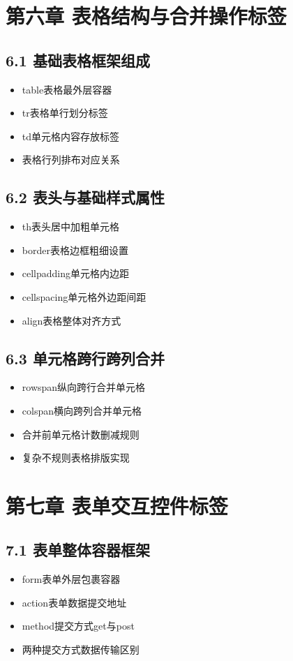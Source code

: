 \section{第六章 表格结构与合并操作标签}
\subsection{6.1 基础表格框架组成}
\begin{itemize}[leftmargin=*]
\item table表格最外层容器
\item tr表格单行划分标签
\item td单元格内容存放标签
\item 表格行列排布对应关系
\end{itemize}

\subsection{6.2 表头与基础样式属性}
\begin{itemize}[leftmargin=*]
\item th表头居中加粗单元格
\item border表格边框粗细设置
\item cellpadding单元格内边距
\item cellspacing单元格外边距间距
\item align表格整体对齐方式
\end{itemize}

\subsection{6.3 单元格跨行跨列合并}
\begin{itemize}[leftmargin=*]
\item rowspan纵向跨行合并单元格
\item colspan横向跨列合并单元格
\item 合并前单元格计数删减规则
\item 复杂不规则表格排版实现
\end{itemize}

\section{第七章 表单交互控件标签}
\subsection{7.1 表单整体容器框架}
\begin{itemize}[leftmargin=*]
\item form表单外层包裹容器
\item action表单数据提交地址
\item method提交方式get与post
\item 两种提交方式数据传输区别
\end{itemize}

